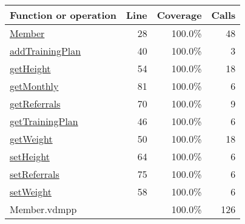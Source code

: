 \bigskip
\begin{longtable}{|l|r|r|r|}
\hline
Function or operation & Line & Coverage & Calls \\
\hline
\hline
\hyperref[Member:28]{Member} & 28&100.0\% & 48 \\
\hline
\hyperref[addTrainingPlan:40]{addTrainingPlan} & 40&100.0\% & 3 \\
\hline
\hyperref[getHeight:54]{getHeight} & 54&100.0\% & 18 \\
\hline
\hyperref[getMonthly:81]{getMonthly} & 81&100.0\% & 6 \\
\hline
\hyperref[getReferrals:70]{getReferrals} & 70&100.0\% & 9 \\
\hline
\hyperref[getTrainingPlan:46]{getTrainingPlan} & 46&100.0\% & 6 \\
\hline
\hyperref[getWeight:50]{getWeight} & 50&100.0\% & 18 \\
\hline
\hyperref[setHeight:64]{setHeight} & 64&100.0\% & 6 \\
\hline
\hyperref[setReferrals:75]{setReferrals} & 75&100.0\% & 6 \\
\hline
\hyperref[setWeight:58]{setWeight} & 58&100.0\% & 6 \\
\hline
\hline
Member.vdmpp & & 100.0\% & 126 \\
\hline
\end{longtable}

